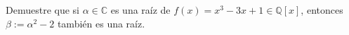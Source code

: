 Demuestre que si $\alpha\in\mathbb{C}$ es una raíz de $f(x)=x^3-3x+1\in\mathbb{Q}[x]$, entonces $\beta:=\alpha^2-2$ también es una raíz.
